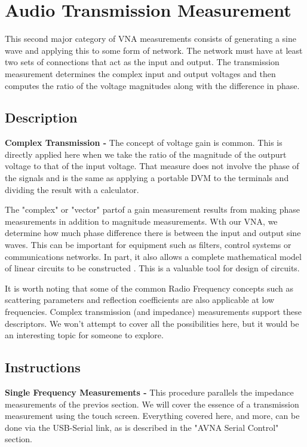 \section{Audio Transmission Measurement}
This second major category of VNA measurements consists of generating a sine wave and applying this to some form of network.
 The network must have at least two sets of connections that act as the input and output.
The transmission measurement determines the complex input and output voltages and then computes the ratio of the voltage magnitudes along with the difference in phase.
%
\subsection{Description}
\textbf{Complex Transmission - }The concept of voltage gain  is common.
This is directly applied here when we take the ratio of the magnitude of the outpurt voltage to that of the input voltage.
That measure does not involve the phase of the signals and is the same as applying a portable DVM to the terminals and dividing the result with a calculator.

The "complex" or "vector" partof a gain measurement results from making phase measurements in addition to magnitude measurements.
Wth our VNA, we determine how much phase difference there is between the input and output sine waves.
This can be important for equipment such as  filters, control systems or communications networks.
In part, it also allows a complete mathematical model of linear circuits to be constructed .  This is a valuable tool for design of circuits.

It is worth noting that some of the common Radio Frequency concepts such as scattering parameters and reflection coefficients are also applicable at low frequencies.  Complex transmission (and impedance) measurements support these descriptors.  We won't attempt to cover all the possibilities here, but it would be an interesting topic for someone to explore.

\subsection{Instructions}
\textbf{Single Frequency Measurements - }This procedure parallels the impedance measurements of the previos section.
We will cover the essence of a transmission measurement using the touch screen.
Everything covered here, and more, can be done via the USB-Serial link, as is described in the "AVNA Serial Control" section.

